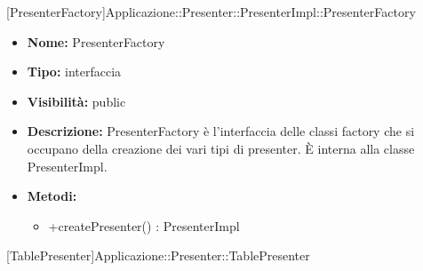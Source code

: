 \begin{itemize}
			\end{itemize}

			
			[PresenterFactory]{Applicazione::Presenter::PresenterImpl::PresenterFactory}
			

	
			
			\begin{itemize}
			\item \textbf{Nome:} PresenterFactory
			\item \textbf{Tipo:} interfaccia
			
			\item \textbf{Visibilità:} public
			\item \textbf{Descrizione:} PresenterFactory è l'interfaccia delle classi factory che si occupano della creazione dei vari tipi di presenter. È interna alla classe PresenterImpl.
			\item \textbf{Metodi:}
				\begin{itemize}
				\setlength{\itemsep}{5pt}
				
					\item[\ding{111}] {{+createPresenter() : PresenterImpl}}
				\end{itemize}
		
			\end{itemize}

			
			[TablePresenter]{Applicazione::Presenter::TablePresenter}
			

